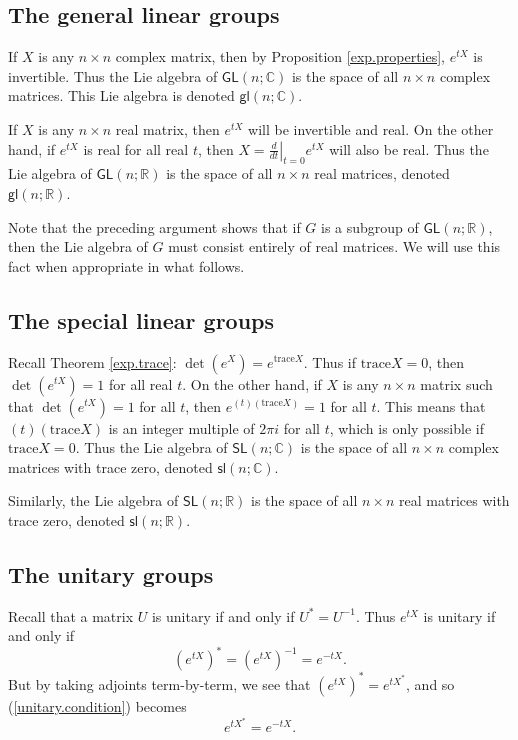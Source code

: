 \documentclass[12pt]{amsbook}
\theoremstyle{plain}
\numberwithin{equation}{chapter}
\numberwithin{theorem}{chapter}
\begin{document}
\subsection{The general linear groups}

If $X$ is any $n\times n$ complex matrix, then by Proposition
\ref{exp.properties}, $e^{tX}$ is invertible. Thus the Lie algebra of
$\mathsf{GL}(n;\mathbb{C})$ is the space of all $n\times n$ complex matrices.
This Lie algebra is denoted $\mathsf{gl}(n;\mathbb{C})$.

If $X$ is any $n\times n$ real matrix, then $e^{tX}$ will be invertible and
real. On the other hand, if $e^{tX}$ is real for all real $t$, then $X=\left.
\tfrac{d}{dt}\right|  _{t=0}e^{tX}$ will also be real. Thus the Lie algebra of
$\mathsf{GL}(n;\mathbb{R})$ is the space of all $n\times n$ real matrices,
denoted $\mathsf{gl}(n;\mathbb{R})$.

Note that the preceding argument shows that if $G$ is a subgroup of
$\mathsf{GL}(n;\mathbb{R})$, then the Lie algebra of $G$ must consist entirely
of real matrices. We will use this fact when appropriate in what follows.

\subsection{The special linear groups}

Recall Theorem \ref{exp.trace}: $\det\left(  e^{X}\right)  =e^{\mathrm{trace}%
X}$. Thus if $\mathrm{trace}X=0$, then $\det\left(  e^{tX}\right)  =1$ for all
real $t$. On the other hand, if $X$ is any $n\times n$ matrix such that
$\det\left(  e^{tX}\right)  =1$ for all $t$, then $e^{(t)(\mathrm{trace}X)}=1$
for all $t$. This means that $(t)(\mathrm{trace}X)$ is an integer multiple of
$2\pi i$ for all $t$, which is only possible if $\mathrm{trace}X=0$. Thus the
Lie algebra of $\mathsf{SL}\left(  n;\mathbb{C}\right)  $ is the space of all
$n\times n$ complex matrices with trace zero, denoted $\mathsf{sl}%
(n;\mathbb{C}) $.

Similarly, the Lie algebra of $\mathsf{SL}\left(  n;\mathbb{R}\right)  $ is
the space of all $n\times n$ real matrices with trace zero, denoted
$\mathsf{sl}\left(  n;\mathbb{R}\right)  $.

\subsection{The unitary groups}

Recall that a matrix $U$ is unitary if and only if $U^{*}=U^{-1}$. Thus
$e^{tX}$ is unitary if and only if
\begin{equation}
\left(  e^{tX}\right)  ^{*}=\left(  e^{tX}\right)  ^{-1}=e^{-tX}%
\text{.}\label{unitary.condition}%
\end{equation}
But by taking adjoints term-by-term, we see that $\left(  e^{tX}\right)
^{*}=e^{tX^{*}}$, and so (\ref{unitary.condition}) becomes
\begin{equation}
e^{tX^{*}}=e^{-tX}\text{.}\label{skew}%
\end{equation}
\end{document}

